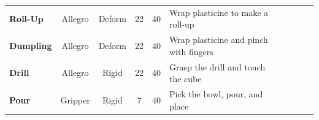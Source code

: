 \begin{table}[t]
{\begin{tabular}{lcccclcccc}
\midrule
\textbf{Roll-Up} & Allegro & Deform & 22 & 40 & Wrap plasticine to make a roll-up\\

\textbf{Dumpling} & Allegro & Deform & 22 & 40 & Wrap plasticine and pinch with fingers\\

\textbf{Drill} & Allegro & Rigid & 22 & 40 & Grasp the drill and touch the cube\\


\textbf{Pour} & Gripper & Rigid & 7 & 40 & Pick the bowl, pour, and place \\
\bottomrule
\bottomrule
\end{tabular}
}
\vspace{-0.2in}
 \end{table}








